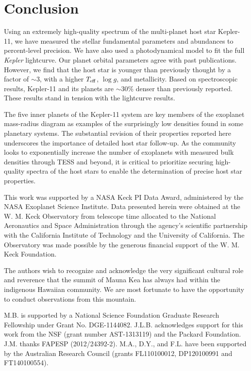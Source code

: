 \documentclass[twocolumn]{aastex61}
\newcommand{\teff}{$T_{\rm eff}$}
\newcommand{\logg}{$\log g$}
\newcommand{\Kepler}{\textit{Kepler} }
\begin{document}
\section{Conclusion}

Using an extremely high-quality spectrum of the multi-planet host star Kepler-11, we have measured the stellar fundamental parameters and abundances to percent-level precision. We have also used a photodynamical model to fit the full \Kepler lightcurve. Our planet orbital parameters agree with past publications. However, we find that the host star is younger than previously thought by a factor of $\sim$3, with a higher \teff, \logg, and metallicity. Based on spectroscopic results, Kepler-11 and its planets are $\sim$30\% denser than previously reported. These results stand in tension with the lightcurve results.

The five inner planets of the Kepler-11 system are key members of the exoplanet mass-radius diagram as examples of the surprisingly low densities found in some planetary systems. The substantial revision of their properties reported here underscores the importance of detailed host star follow-up. As the community looks to exponentially increase the number of exoplanets with measured bulk densities through TESS and beyond, it is critical to prioritize securing high-quality spectra of the host stars to enable the determination of precise host star properties.

\bigskip
\acknowledgements

This work was supported by a NASA Keck PI Data Award, administered by the NASA Exoplanet Science Institute. Data presented herein were obtained at the W. M. Keck Observatory from telescope time allocated to the National Aeronautics and Space Administration through the agency's scientific partnership with the California Institute of Technology and the University of California. The Observatory was made possible by the generous financial support of the W. M. Keck Foundation.

The authors wish to recognize and acknowledge the very significant cultural role and reverence that the summit of Mauna Kea has always had within the indigenous Hawaiian community. We are most fortunate to have the opportunity to conduct observations from this mountain.

M.B. is supported by a National Science Foundation Graduate Research Fellowship under Grant No. DGE-1144082.  J.L.B. acknowledges support for this work from the NSF (grant number AST-1313119) and the Packard Foundation.  J.M. thanks FAPESP (2012/24392-2). M.A., D.Y., and F.L. have been supported by the Australian Research Council
(grants FL110100012, DP120100991 and FT140100554).
\end{document}
